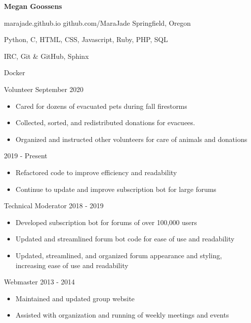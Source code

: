 \documentclass[11pt]{article} %
\begin{document}
\centerline{{\Huge \bf Megan Goossens}}
\bigskip


        {marajade.github.io}
        {github.com/MaraJade}
        {Springfield, Oregon}



      {Python, C, HTML, CSS, Javascript, Ruby, PHP, SQL}

      {IRC, Git \& GitHub, Sphinx}

      {Docker}


\begin{description}
\squish
{}
           {Volunteer}
           {September 2020}

\begin{itemize}
  \item Cared for dozens of evacuated pets during fall firestorms
  \item Collected, sorted, and redistributed donations for evacuees.
  \item Organized and instructed other volunteers for care of animals and
    donations
\end{itemize}


            {}
            {2019 - Present}

\begin{itemize}
  \item Refactored code to improve efficiency and readability
  \item Continue to update and improve subscription bot for large forums
\end{itemize}


            {Technical Moderator}
            {2018 - 2019}

\begin{itemize}
  \item Developed subscription bot for forums of over 100,000 users
  \item Updated and streamlined forum bot code for ease of use and readability
  \item Updated, streamlined, and organized forum appearance and styling,
    increasing ease of use and readability
\end{itemize}

           {Webmaster}
           {2013 - 2014}

\begin{itemize}
  \item Maintained and updated group website
  \item Assisted with organization and running of weekly meetings and events
\end{itemize}


\end{description}
\end{document}
